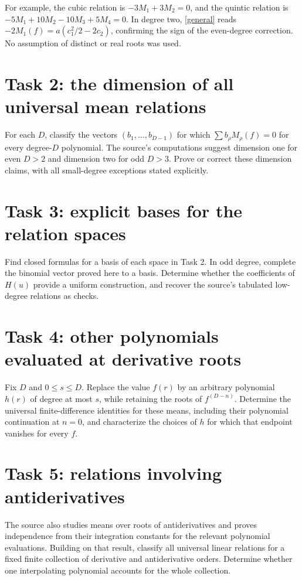 \documentclass[11pt]{article}
\begin{document}
For example, the cubic relation is $-3M_1+3M_2=0$, and the
quintic relation is $-5M_1+10M_2-10M_3+5M_4=0$.
In degree two, \eqref{general} reads
$-2M_1(f)=a(c_1^2/2-2c_2)$, confirming the sign of the even-degree
correction. No assumption of distinct or real roots was used.

\section*{Task 2: the dimension of all universal mean relations}
For each $D$, classify the vectors $(b_1,\ldots,b_{D-1})$ for
which $\sum b_\rho M_\rho(f)=0$ for every degree-$D$ polynomial.
The source's computations suggest dimension one for even $D>2$
and dimension two for odd $D>3$. Prove or correct these dimension
claims, with all small-degree exceptions stated explicitly.

\section*{Task 3: explicit bases for the relation spaces}
Find closed formulas for a basis of each space in Task 2. In odd
degree, complete the binomial vector proved here to a basis.
Determine whether the coefficients of $H(u)$ provide a uniform
construction, and recover the source's tabulated low-degree
relations as checks.

\section*{Task 4: other polynomials evaluated at derivative roots}
Fix $D$ and $0\leq s\leq D$. Replace the value $f(r)$ by an
arbitrary polynomial $h(r)$ of degree at most $s$, while retaining
the roots of $f^{(D-n)}$. Determine the universal finite-difference
identities for these means, including their polynomial continuation
at $n=0$, and characterize the choices of $h$ for which that
endpoint vanishes for every $f$.

\section*{Task 5: relations involving antiderivatives}
The source also studies means over roots of antiderivatives and
proves independence from their integration constants for the
relevant polynomial evaluations. Building on that result, classify
all universal linear relations for a fixed finite collection of
derivative and antiderivative orders. Determine whether one
interpolating polynomial accounts for the whole collection.
\end{document}

